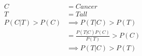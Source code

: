\documentclass[10pt]{article}
\begin{document}
\begin{align*}C & = Cancer \\
T & = Tall \\
P(C|T) > P(C) & \implies P(T|C) > P(T) \\
& = \frac{P(T|C) P(C)}{P(T)} > P(C) \\
& \implies P(T|C) > P(T)\end{align*}
\end{document}
